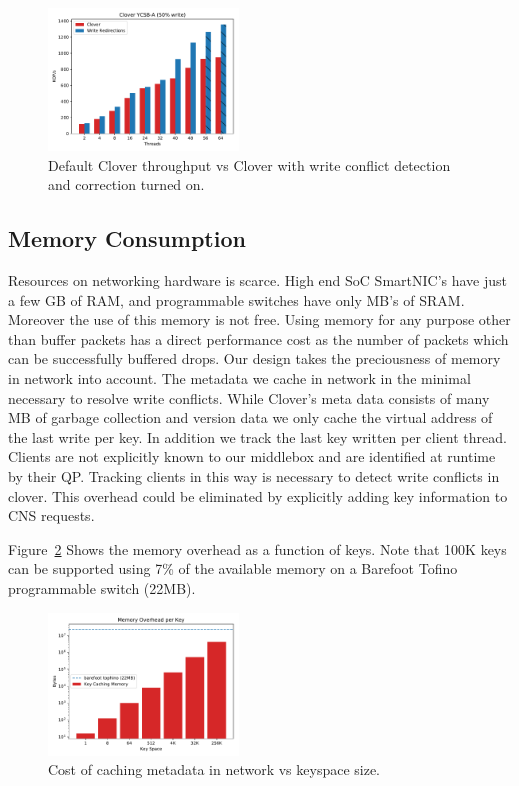 \begin{figure}
    \includegraphics[width=0.45\textwidth]{fig/throughput.pdf}
    \caption{Default Clover throughput vs Clover with write conflict
    detection and correction turned on.}
    \label{fig:throughput}
\end{figure}

\subsection{Memory Consumption}

Resources on networking hardware is scarce. High end SoC SmartNIC's
have just a few GB of RAM, and programmable switches have only MB's of
SRAM. Moreover the use of this memory is not free. Using memory for
any purpose other than buffer packets has a direct performance cost as
the number of packets which can be successfully buffered drops. Our
design takes the preciousness of memory in network into account. The
metadata we cache in network in the minimal necessary to resolve write
conflicts. While Clover's meta data consists of many MB of garbage
collection and version data we only cache the virtual address of the
last write per key. In addition we track the last key written per
client thread. Clients are not explicitly known to our middlebox and
are identified at runtime by their QP. Tracking clients in this way is
necessary to detect write conflicts in clover. This overhead could be
eliminated by explicitly adding key information to CNS requests.

Figure~\ref{fig:memory} Shows the memory overhead as a function of
keys. Note that 100K keys can be supported using 7\% of the available
memory on a Barefoot Tofino programmable switch (22MB).

\begin{figure}
    \includegraphics[width=0.45\textwidth]{fig/memory.pdf}
    \caption{Cost of caching metadata in network vs keyspace size.}
    \label{fig:memory}
\end{figure}


